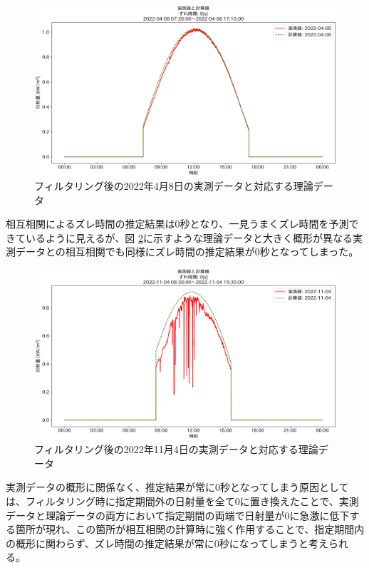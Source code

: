 \documentclass[a4j,12pt,]{jarticle}
\begin{document}
\begin{figure}[H]
  \begin{center}
    \includegraphics[width=160mm]{2022-04-08_partial_corr.png}
    \caption{フィルタリング後の2022年4月8日の実測データと対応する理論データ}
    \label{p6}
  \end{center}
\end{figure}

相互相関によるズレ時間の推定結果は0秒となり、一見うまくズレ時間を予測できているように見えるが、図 \ref{p7}に示すような理論データと大きく概形が異なる実測データとの相互相関でも同様にズレ時間の推定結果が0秒となってしまった。

\begin{figure}[H]
  \begin{center}
    \includegraphics[width=160mm]{2022-11-04_partial_corr.png}
    \caption{フィルタリング後の2022年11月4日の実測データと対応する理論データ}
    \label{p7}
  \end{center}
\end{figure}

実測データの概形に関係なく、推定結果が常に0秒となってしまう原因としては、フィルタリング時に指定期間外の日射量を全て0に置き換えたことで、実測データと理論データの両方において指定期間の両端で日射量が0に急激に低下する箇所が現れ、この箇所が相互相関の計算時に強く作用することで、指定期間内の概形に関わらず、ズレ時間の推定結果が常に0秒になってしまうと考えられる。
\end{document}
